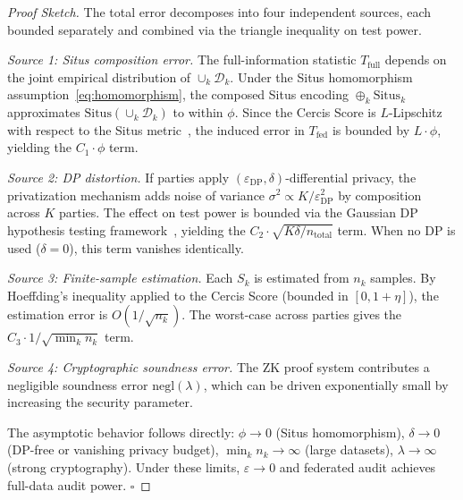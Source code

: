 \documentclass[12pt,a4paper]{article}
\newcommand{\cD}{\mathcal{D}}
\newcommand{\Situs}{\mathrm{Situs}}
\newcommand{\ZK}{\mathrm{ZK}}
\begin{document}
\begin{proof}[Proof Sketch]
The total error decomposes into four independent sources, each bounded
separately and combined via the triangle inequality on test power.

\textit{Source 1: Situs composition error.}
The full-information statistic $T_{\mathrm{full}}$ depends on the joint
empirical distribution of $\cup_k \cD_k$.  Under the Situs homomorphism
assumption~\eqref{eq:homomorphism}, the composed Situs encoding
$\oplus_k \Situs_k$ approximates $\Situs(\cup_k \cD_k)$ to within $\phi$.
Since the Cercis Score is $L$-Lipschitz with respect to the Situs
metric~\citep{scx2024cercis}, the induced error in $T_{\mathrm{fed}}$
is bounded by $L \cdot \phi$, yielding the $C_1 \cdot \phi$ term.

\textit{Source 2: DP distortion.}
If parties apply $(\varepsilon_{\mathrm{DP}}, \delta)$-differential privacy,
the privatization mechanism adds noise of variance
$\sigma^2 \propto K/\varepsilon_{\mathrm{DP}}^2$ by composition across $K$
parties.  The effect on test power is bounded via the Gaussian DP
hypothesis testing framework~\citep{dong2022gaussian}, yielding the
$C_2 \cdot \sqrt{K \delta / n_{\mathrm{total}}}$ term.  When no DP is
used ($\delta = 0$), this term vanishes identically.

\textit{Source 3: Finite-sample estimation.}
Each $S_k$ is estimated from $n_k$ samples.  By Hoeffding's inequality
applied to the Cercis Score (bounded in $[0, 1+\eta]$), the estimation
error is $O(1/\sqrt{n_k})$.  The worst-case across parties gives the
$C_3 \cdot 1/\sqrt{\min_k n_k}$ term.

\textit{Source 4: Cryptographic soundness error.}
The $\ZK$ proof system contributes a negligible soundness error
$\mathrm{negl}(\lambda)$, which can be driven exponentially small by
increasing the security parameter.

The asymptotic behavior follows directly: $\phi \to 0$ (Situs homomorphism),
$\delta \to 0$ (DP-free or vanishing privacy budget), $\min_k n_k \to \infty$
(large datasets), $\lambda \to \infty$ (strong cryptography).  Under these
limits, $\varepsilon \to 0$ and federated audit achieves full-data audit
power.  $\square$
\end{proof}
\end{document}
